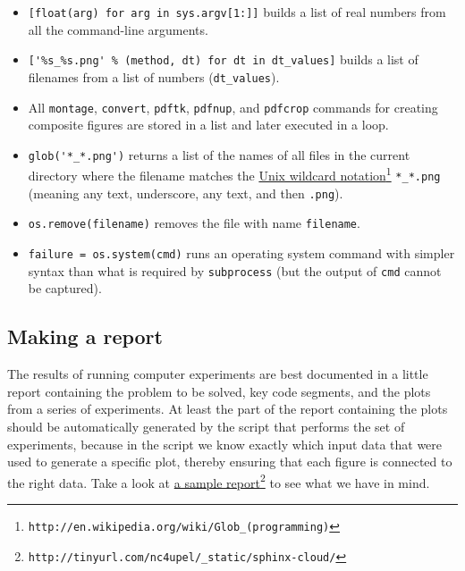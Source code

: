 \documentclass[graybox,sectrefs,envcountresetchap,open=right,final]{svmonodo}
\begin{document}
\begin{itemize}
 \item \texttt{[float(arg) for arg in sys.argv[1:]]} builds a list of real numbers from all the command-line arguments.

 \item \Verb!['%

 \item All \texttt{montage}, \texttt{convert}, \texttt{pdftk}, \texttt{pdfnup}, and \texttt{pdfcrop} commands for creating composite figures are stored in a list and later executed in a loop.

 \item \Verb!glob('*_*.png')! returns a list of the names of all files in the current directory where the filename matches the \href{{http://en.wikipedia.org/wiki/Glob_(programming)}}{Unix wildcard notation}\footnote{\texttt{http://en.wikipedia.org/wiki/Glob\_(programming)}} \Verb!*_*.png! (meaning any text, underscore, any text, and then \texttt{.png}).

 \item \texttt{os.remove(filename)} removes the file with name \texttt{filename}.

 \item \texttt{failure = os.system(cmd)} runs an operating system command with simpler syntax than what is required by \texttt{subprocess} (but the output of \texttt{cmd} cannot be captured).
\end{itemize}

\noindent
\subsection{Making a report}
\label{softeng1:exper:report}

The results of running computer experiments are best documented in a
little report containing the problem to be solved, key code segments,
and the plots from a series of experiments. At least the part of the
report containing the plots should be automatically generated by the
script that performs the set of experiments, because in the script we
know exactly which input data that were used to generate a specific
plot, thereby ensuring that each figure is connected to the
right data. Take a look at \href{{http://tinyurl.com/nc4upel/_static/sphinx-cloud/}}{a sample report}\footnote{\texttt{http://tinyurl.com/nc4upel/\_static/sphinx-cloud/}}  to see what we have in
mind.
\end{document}
